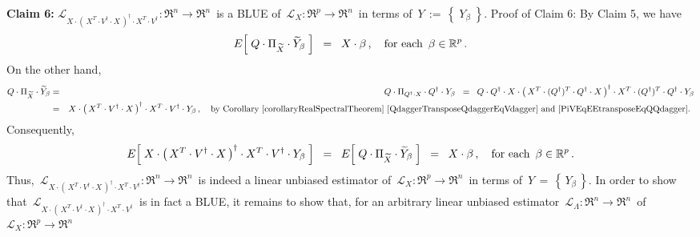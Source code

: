 \begin{enumerate}
	\vskip 0.5cm
	\noindent
	\textbf{Claim 6:}\quad
	$\mathcal{L}_{X \cdot \left(\,X^{T} \cdot V^{\dagger} \cdot X\,\right)^{\dagger} \cdot X^{T} \cdot V^{\dagger}}
	: \Re^{n} \longrightarrow \Re^{n}$\,
	is a BLUE of 
	\,$\mathcal{L}_{X} : \Re^{p} \longrightarrow \Re^{n}$\,
	in terms of
	\,$Y \,:=\, \left\{\;Y_{\beta}\;\right\}$.
	\vskip 0.0cm
	\noindent
	Proof of Claim 6:\quad
	By Claim 5, we have
	\begin{equation*}
	E\!\left[\; Q \cdot \Pi_{\widetilde{X}} \cdot \widetilde{Y}_{\beta} \;\right]
	\;\; = \;\; X \cdot \beta\,,
	\quad
	\textnormal{for each \,$\beta \in \Re^{p}$}\,.
	\end{equation*}
	On the other hand,
	\begin{eqnarray*}
	Q \cdot \Pi_{\widetilde{X}} \cdot \widetilde{Y}_{\beta}
	& = &
		Q \cdot \Pi_{Q^{\dagger} \cdot X} \cdot Q^{\dagger} \cdot Y_{\beta}
	\;\; = \;\;
		Q \cdot Q^{\dagger}
		\cdot
		X \cdot \left(\,X^{T} \cdot (Q^{\dagger})^{T} \cdot Q^{\dagger} \cdot X\,\right)^{\dagger}
		\cdot
		X^{T}
		\cdot
		(Q^{\dagger})^{T} \cdot Q^{\dagger}
		\cdot
		Y_{\beta}
	\\
	& = &
		X \cdot \left(\,X^{T} \cdot V^{\dagger} \cdot X\,\right)^{\dagger} \cdot X^{T} \cdot V^{\dagger} \cdot Y_{\beta}\,,
		\quad
		\textnormal{by Corollary \ref{corollaryRealSpectralTheorem}
			\eqref{QdaggerTransposeQdaggerEqVdagger} and \eqref{PiVEqEEtransposeEqQQdagger}.
			}
	\end{eqnarray*}
	Consequently,
	\begin{equation*}
	E\!\left[\;
		X \cdot \left(\,X^{T} \cdot V^{\dagger} \cdot X\,\right)^{\dagger} \cdot X^{T} \cdot V^{\dagger} \cdot Y_{\beta}
		\;\right]
	\;\; = \;\;
		E\!\left[\;
			Q \cdot \Pi_{\widetilde{X}} \cdot \widetilde{Y}_{\beta}
			\;\right]
	\;\; = \;\;
		X \cdot \beta\,,
	\quad
	\textnormal{for each \,$\beta \in \Re^{p}$}\,.
	\end{equation*}
	Thus,
	\,$\mathcal{L}_{X \cdot \left(\,X^{T} \cdot V^{\dagger} \cdot X\,\right)^{\dagger} \cdot X^{T} \cdot V^{\dagger}}
	: \Re^{n} \longrightarrow \Re^{n}$\,
	is indeed a linear unbiased estimator of
	\,$\mathcal{L}_{X} : \Re^{p} \longrightarrow \Re^{n}$\,
	in terms of
	\,$Y \,=\, \left\{\,Y_{\beta}\,\right\}$.
	In order to show that
	\,$\mathcal{L}_{X \cdot \left(\,X^{T} \cdot V^{\dagger} \cdot X\,\right)^{\dagger} \cdot X^{T} \cdot V^{\dagger}}$\,
	is in fact a BLUE, it remains to show that, for an arbitrary linear unbiased estimator
	\,$\mathcal{L}_{\Lambda} : \Re^{n} \longrightarrow \Re^{n}$\,
	of
	\,$\mathcal{L}_{X} : \Re^{p} \longrightarrow \Re^{n}$\,

\end{enumerate}
